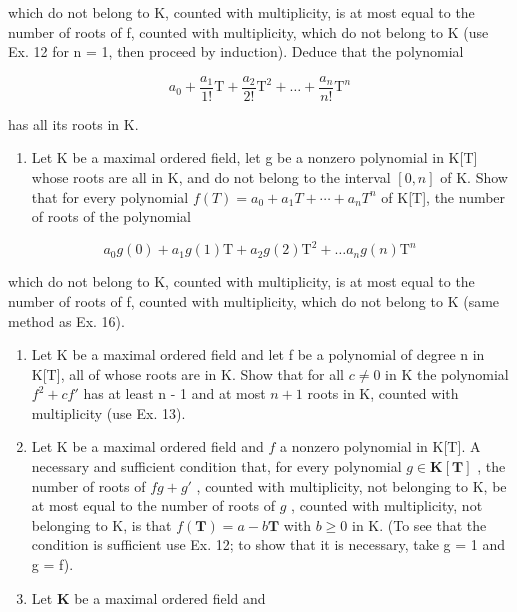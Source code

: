 which do not belong to K, counted with multiplicity, is at most equal to the number of roots of f, counted with multiplicity, which do not belong to K (use Ex. 12 for n = 1, then proceed by induction). Deduce that the polynomial

\[
a _ {0} + \frac {a _ {1}}{1 !} \mathrm{T} + \frac {a _ {2}}{2 !} \mathrm{T} ^ {2} + \dots + \frac {a _ {n}}{n !} \mathrm{T} ^ {n}
\]

has all its roots in K.

\begin{enumerate}
\def\labelenumi{\arabic{enumi})}
\setcounter{enumi}{16}
\tightlist
\item
  Let K be a maximal ordered field, let g be a nonzero polynomial in K{[}T{]} whose roots are all in K, and do not belong to the interval \([0, n]\) of K. Show that for every polynomial \(f(T) = a_{0} + a_{1}T + \cdots + a_{n}T^{n}\) of K{[}T{]}, the number of roots of the polynomial
\end{enumerate}

\[
a _ {0} g (0) + a _ {1} g (1) \mathrm{T} + a _ {2} g (2) \mathrm{T} ^ {2} + \dots a _ {n} g (n) \mathrm{T} ^ {n}
\]

which do not belong to K, counted with multiplicity, is at most equal to the number of roots of f, counted with multiplicity, which do not belong to K (same method as Ex. 16).

\begin{enumerate}
\def\labelenumi{\arabic{enumi})}
\setcounter{enumi}{17}
\item
  Let K be a maximal ordered field and let f be a polynomial of degree n in K{[}T{]}, all of whose roots are in K. Show that for all \(c \neq 0\) in K the polynomial \(f^{2} + cf'\) has at least n - 1 and at most \(n + 1\) roots in K, counted with multiplicity (use Ex. 13).
\item
  Let K be a maximal ordered field and \(f\) a nonzero polynomial in K{[}T{]}. A necessary and sufficient condition that, for every polynomial \(g \in \mathbf{K}[\mathbf{T}]\) , the number of roots of \(fg + g'\) , counted with multiplicity, not belonging to K, be at most equal to the number of roots of \(g\) , counted with multiplicity, not belonging to K, is that \(f(\mathbf{T}) = a - b\mathbf{T}\) with \(b \geqslant 0\) in K. (To see that the condition is sufficient use Ex. 12; to show that it is necessary, take g = 1 and g = f).
\item
  Let \(\mathbf{K}\) be a maximal ordered field and
\end{enumerate}

